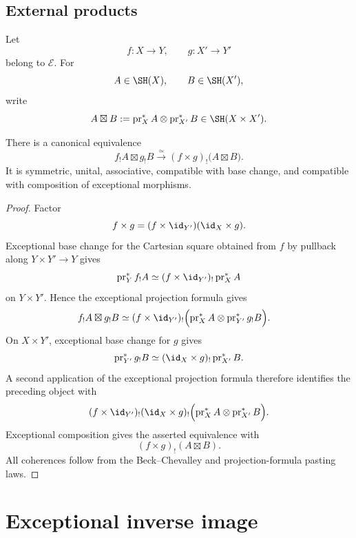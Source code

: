 \subsection{External products}

Let
\[
    f:X\longrightarrow Y,
    \qquad
    g:X'\longrightarrow Y'
\]
belong to \(\mathcal E\).  For
\[
    A\in\SH(X),
    \qquad
    B\in\SH(X'),
\]
write
\[
    A\boxtimes B
    :=
    \operatorname{pr}_X^*A
    \otimes
    \operatorname{pr}_{X'}^*B
    \in
    \SH(X\times X').
\]

\begin{proposition}
\label{prop:exceptional-external-products}
There is a canonical equivalence
\[
    f_!A\boxtimes g_!B
    \xrightarrow{\simeq}
    (f\times g)_!
    \bigl(
      A\boxtimes B
    \bigr).
\]
It is symmetric, unital, associative, compatible with base change, and
compatible with composition of exceptional morphisms.
\end{proposition}

\begin{proof}
Factor
\[
    f\times g
    =
    (f\times\id_{Y'})
    (\id_X\times g).
\]
Exceptional base change for the Cartesian square obtained from \(f\) by
pullback along \(Y\times Y'\to Y\) gives
\[
    \operatorname{pr}_Y^*f_!A
    \simeq
    (f\times\id_{Y'})_!
    \operatorname{pr}_X^*A
\]
on \(Y\times Y'\).  Hence the exceptional projection formula gives
\[
\begin{aligned}
    f_!A\boxtimes g_!B
    &\simeq
    (f\times\id_{Y'})_!
    \Bigl(
      \operatorname{pr}_X^*A
      \otimes
      \operatorname{pr}_{Y'}^*g_!B
    \Bigr).
\end{aligned}
\]
On \(X\times Y'\), exceptional base change for \(g\) gives
\[
    \operatorname{pr}_{Y'}^*g_!B
    \simeq
    (\id_X\times g)_!
    \operatorname{pr}_{X'}^*B.
\]
A second application of the exceptional projection formula therefore
identifies the preceding object with
\[
\begin{aligned}
    (f\times\id_{Y'})_!
    (\id_X\times g)_!
    \Bigl(
      \operatorname{pr}_X^*A
      \otimes
      \operatorname{pr}_{X'}^*B
    \Bigr).
\end{aligned}
\]
Exceptional composition gives the asserted equivalence with
\[
    (f\times g)_!(A\boxtimes B).
\]
All coherences follow from the Beck--Chevalley and projection-formula
pasting laws.
\end{proof}

\section{Exceptional inverse image}
\label{sec:exceptional-inverse-image}

